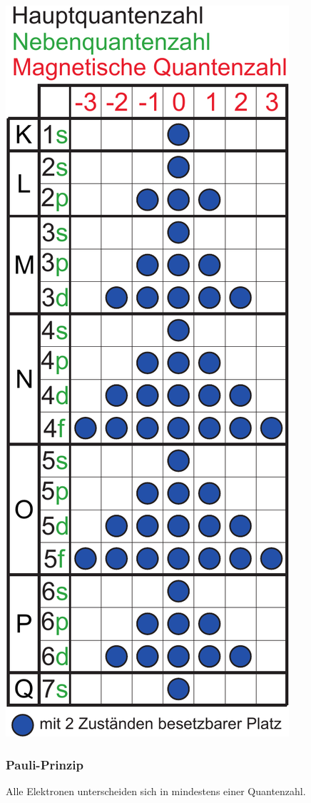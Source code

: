 \documentclass[a4paper,twocolumn,10pt]{article}
\begin{document}
\begin{center}
\includegraphics[width=0.6\columnwidth]{Grafiken/Quantenzahlen}
\end{center}

\subsubsection{Pauli-Prinzip}
Alle Elektronen unterscheiden sich in mindestens einer Quantenzahl.
\end{document}
